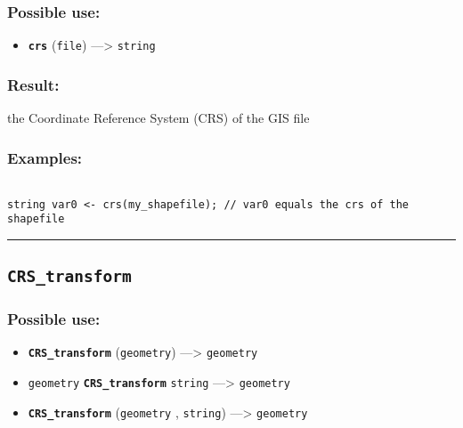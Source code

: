 \documentclass[]{book}
\providecommand{\tightlist}{%
  \setlength{\itemsep}{0pt}\setlength{\parskip}{0pt}}
\theoremstyle{definition}
\theoremstyle{definition}
\theoremstyle{definition}
\theoremstyle{remark}
\begin{document}
\subsubsection{Possible use:}\label{possible-use-118}

\begin{itemize}
\tightlist
\item
  \textbf{\texttt{crs}} (\texttt{file}) ---\textgreater{}
  \texttt{string}
\end{itemize}

\subsubsection{Result:}\label{result-115}

the Coordinate Reference System (CRS) of the GIS file

\subsubsection{Examples:}\label{examples-90}

\begin{verbatim}
 
string var0 <- crs(my_shapefile); // var0 equals the crs of the shapefile
\end{verbatim}

\begin{center}\rule{0.5\linewidth}{\linethickness}\end{center}

\subsection{\texorpdfstring{\texttt{CRS\_transform}}{CRS\_transform}}\label{crs_transform}

\subsubsection{Possible use:}\label{possible-use-119}

\begin{itemize}
\tightlist
\item
  \textbf{\texttt{CRS\_transform}} (\texttt{geometry}) ---\textgreater{}
  \texttt{geometry}
\item
  \texttt{geometry} \textbf{\texttt{CRS\_transform}} \texttt{string}
  ---\textgreater{} \texttt{geometry}
\item
  \textbf{\texttt{CRS\_transform}} (\texttt{geometry} , \texttt{string})
  ---\textgreater{} \texttt{geometry}
\end{itemize}
\end{document}
